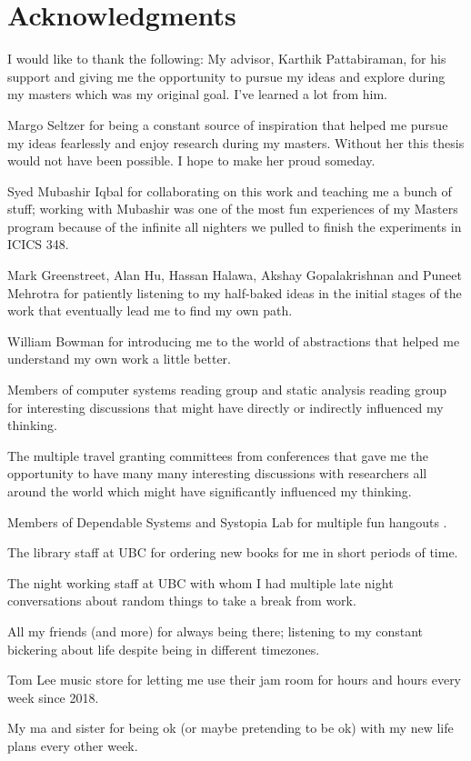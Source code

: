 
\chapter{Acknowledgments}

I would like to thank the following:
My advisor, Karthik Pattabiraman, for his support and giving me the opportunity to pursue my ideas and explore during my masters which was my original goal. I've learned a lot from him. 

Margo Seltzer for being a constant source of inspiration that helped me pursue my ideas fearlessly and enjoy research during my masters. Without her this thesis would not have been possible. I hope to make her proud someday. 

Syed Mubashir Iqbal for collaborating on this work and teaching me a bunch of stuff; working with Mubashir was one of the most fun experiences of my Masters program because of the infinite all nighters we pulled to finish the experiments in ICICS 348. 

Mark Greenstreet, Alan Hu, Hassan Halawa, Akshay Gopalakrishnan and Puneet Mehrotra for patiently listening to my half-baked ideas in the initial stages of the work that eventually lead me to find my own path. 

William Bowman for introducing me to the world of abstractions that helped me understand my own work a little better.  

Members of computer systems reading group and static analysis reading group for interesting discussions that might have directly or indirectly influenced my thinking. 

The multiple travel granting committees from conferences that gave me the opportunity to have many many interesting discussions with researchers all around the world which might have significantly influenced my thinking. 

Members of Dependable Systems and Systopia Lab for multiple fun hangouts . 

The library staff at UBC for ordering new books for me in short periods of time. 

The night working staff at UBC with whom I had multiple late night conversations about random things to take a break from work. 


All my friends (and more) for always being there; listening to my constant bickering about life despite being in different timezones. 

Tom Lee music store for letting me use their jam room for hours and hours every week since 2018. 

My ma and sister for being ok (or maybe pretending to be ok) with my new life plans every other week.    




